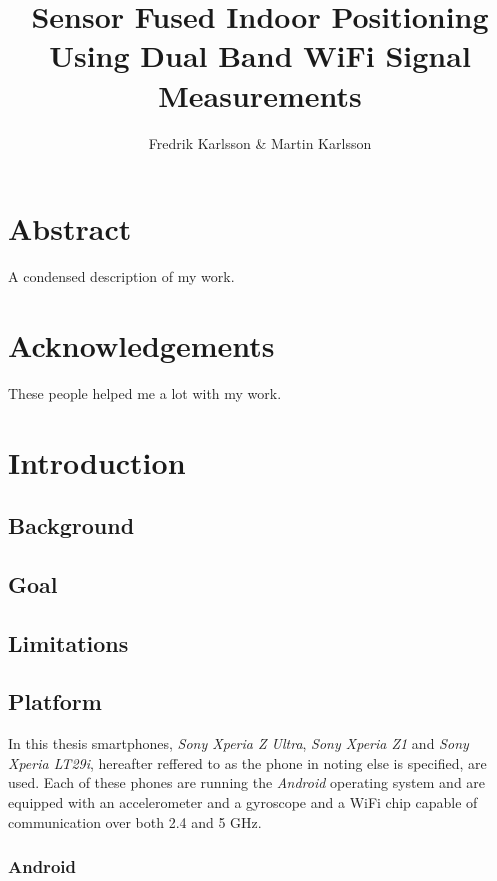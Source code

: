 \documentclass{LTHthesis}
\begin{document}
\begin{titlepages}
\author{Fredrik Karlsson \& Martin Karlsson}
\title{Sensor Fused Indoor Positioning Using Dual Band WiFi Signal Measurements}%
\end{titlepages}
\chapter*{Abstract}
A condensed description of my work.
\chapter*{Acknowledgements}
These people helped me a lot with my work.
\tableofcontents
\chapter{Introduction}
\section{Background}
\section{Goal}
\section{Limitations}
\section{Platform}

%
In this thesis smartphones, \emph{Sony Xperia Z Ultra}, \emph{Sony Xperia Z1} and \emph{Sony Xperia LT29i}, hereafter reffered to as the phone in noting else is specified, are used. Each of these phones are running the \emph{Android} operating system and are equipped with an accelerometer and a gyroscope and a WiFi chip capable of communication over both 2.4 and 5 GHz.  
%
\subsection{Android} 
%

%
\end{document}
